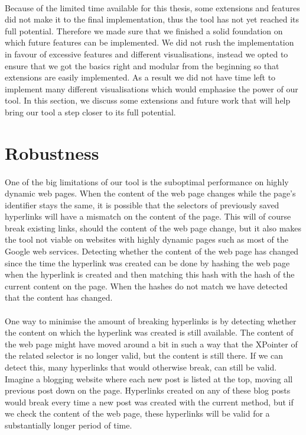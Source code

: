 \paragraph{}
Because of the limited time available for this thesis,  some extensions and features did not make it to the final implementation, thus the tool has not yet reached its full potential. Therefore we made sure that we finished a solid foundation on which future features can be implemented. We did not rush the implementation in favour of excessive features and different visualisations, instead we opted to ensure that we got the basics right and modular from the beginning so that extensions are easily implemented. As a result we did not have time left to implement many different visualisations which would emphasise the power of our tool. In this section, we discuss some extensions and future work that will help bring our tool a step closer to its full potential.
\section{Robustness} \label{sec:Robustness}
\paragraph{}
One of the big limitations of our tool is the suboptimal performance on highly dynamic web pages. When the content of the web page changes while the page's identifier stays the same, it is possible that the selectors of previously saved hyperlinks will have a mismatch on the content of the page. This will of course break existing links, should the content of the web page change, but it also makes the tool not viable on websites with highly dynamic pages such as most of the Google web services. Detecting whether the content of the web page has changed since the time the hyperlink was created can be done by hashing the web page when the hyperlink is created and then matching this hash with the hash of the current content on the page. When the hashes do not match we have detected that the content has changed.
\paragraph{}
One way to minimise the amount of breaking hyperlinks is by detecting whether the content on which the hyperlink was created is still available. The content of the web page might have moved around a bit in such a way that the XPointer of the related selector is no longer valid, but the content is still there. If we can detect this, many hyperlinks that would otherwise break, can still be valid. Imagine a blogging website where each new post is listed at the top, moving all previous post down on the page. Hyperlinks created on any of these blog posts would break every time a new post was created with the current method, but if we check the content of the web page, these hyperlinks will be valid for a substantially longer period of time.
